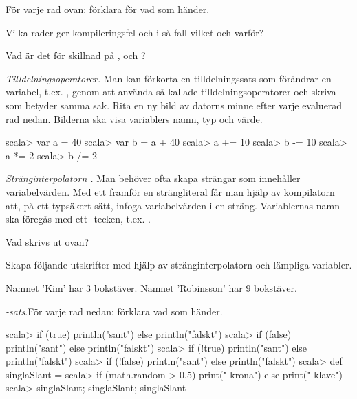 {{{{\Subtask För varje rad ovan: förklara för vad som händer. 

\Subtask Vilka rader ger kompileringsfel och i så fall vilket och varför?

\Subtask\Pen Vad är det för skillnad på ,  och ?

\Task\Pen \emph{Tilldelningsoperatorer.} Man kan förkorta en tilldelningssats som förändrar en variabel, t.ex. , genom att använda så kallade tilldelningsoperatorer och skriva  som betyder samma sak. Rita en ny bild av datorns minne efter varje evaluerad rad nedan. Bilderna ska visa variablers namn, typ och värde.  %

\begin{REPL}
scala> var a = 40
scala> var b = a + 40
scala> a += 10
scala> b -= 10
scala> a *= 2
scala> b /= 2
\end{REPL}

\Task \emph{Stränginterpolatorn .} Man behöver ofta skapa strängar som innehåller variabelvärden. Med ett  framför en strängliteral får man hjälp av kompilatorn att, på ett typsäkert sätt, infoga variabelvärden i en sträng. Variablernas namn ska föregås med ett \code{$}-tecken, t.ex. .  %


\Subtask Vad skrivs ut ovan?

\Subtask Skapa följande utskrifter med hjälp av stränginterpolatorn  och lämpliga variabler.
\begin{REPL}
Namnet 'Kim' har 3 bokstäver.
Namnet 'Robinsson' har 9 bokstäver.
\end{REPL}



\Task {}\textit{-sats}.För varje rad nedan; förklara vad som händer.  %
\begin{REPL}
scala> if (true) println("sant") else println("falskt")
scala> if (false) println("sant") else println("falskt")
scala> if (!true) println("sant") else println("falskt")
scala> if (!false) println("sant") else println("falskt")
scala> def singlaSlant = 
scala> 	 if (math.random > 0.5) print(" krona") else print(" klave")
scala> singlaSlant; singlaSlant; singlaSlant
\end{REPL}


}}}}
